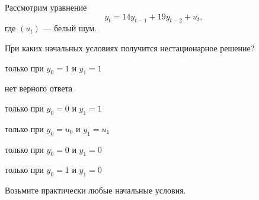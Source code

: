 
\begin{question}
Рассмотрим уравнение
\[
y_t = 14 y_{t-1} + 19 y_{t-2} + u_t,
\]
где \((u_t)\) --- белый шум.

При каких начальных условиях получится нестационарное решение?
\begin{answerlist}
  \item только при \(y_0 = 1\) и \(y_1 = 1\)
  \item нет верного ответа
  \item только при \(y_0 = 0\) и \(y_1 = 1\)
  \item только при \(y_0 = u_0\) и \(y_1 = u_1\)
  \item только при \(y_0 = 0\) и \(y_1=0\)
  \item только при \(y_0 = 1\) и \(y_1 = 0\)
\end{answerlist}
\end{question}

\begin{solution}
Возьмите практически любые начальные условия.
\end{solution}

